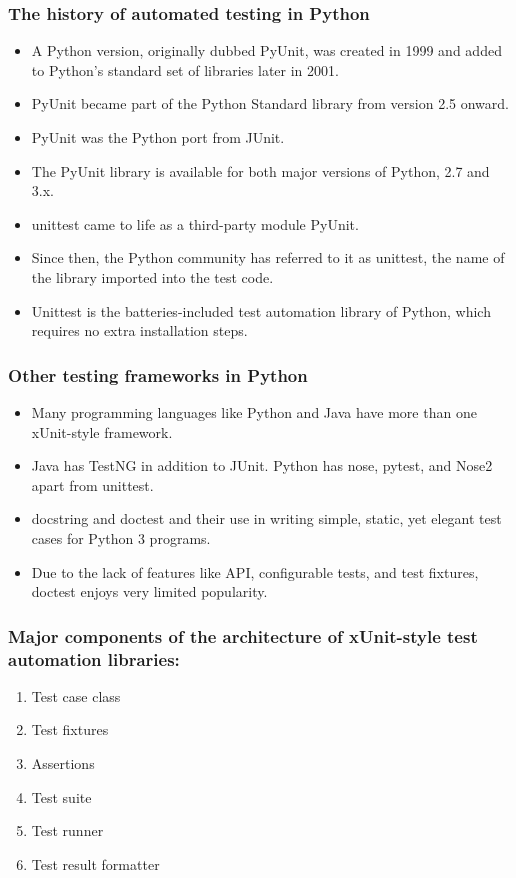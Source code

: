 \documentclass[11pt]{beamer}
\begin{document}
\begin{frame}
\frametitle{The history of automated testing in Python}
\begin{itemize}
	\item A Python version, originally dubbed PyUnit, was created in 1999 and added to Python's standard set of libraries later in 2001.
	\item PyUnit became part of the Python Standard library from version 2.5 onward.
	\item PyUnit was the Python port from JUnit.
	\item The PyUnit library is available for both major versions of Python, 2.7 and 3.x. 
	\item unittest came to life as a third-party module PyUnit.
	\item Since then, the Python community has referred to it as unittest, the name of the library imported into the test code.
	\item Unittest is the batteries-included test automation library of Python, which requires no extra installation steps.
\end{itemize}
\end{frame}

\begin{frame}
\frametitle{Other testing frameworks in Python}
\begin{itemize}
	\item Many programming languages like Python and Java have more than one xUnit-style framework.
	\item Java has TestNG in addition to JUnit. Python has nose, pytest, and Nose2 apart from unittest.
	\item docstring and doctest and their use in writing simple, static, yet elegant test cases for Python 3 programs.
	\item Due to the lack of features like API, configurable tests, and test fixtures, doctest enjoys very limited popularity.
\end{itemize}
\end{frame}

\begin{frame}
\frametitle{Major components of the architecture of xUnit-style test automation libraries:}
\begin{enumerate}
	\item Test case class
	\item Test fixtures
	\item Assertions
	\item Test suite
	\item Test runner
	\item Test result formatter
\end{enumerate}
\end{frame}
\end{document}
